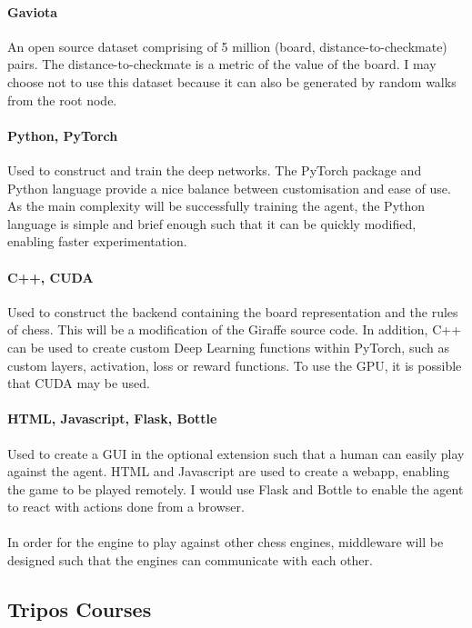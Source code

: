 \documentclass[a4paper]{article}
\begin{document}
\paragraph{Gaviota} An open source dataset comprising of 5 million (board, distance-to-checkmate) pairs. The distance-to-checkmate is a metric of the value of the board. I may choose not to use this dataset because it can also be generated by random walks from the root node. \cite{gaviota} \cite{giraffe}

\paragraph{Python, PyTorch} Used to construct and train the deep networks. The PyTorch package and Python language provide a nice balance between customisation and ease of use. As the main complexity will be successfully training the agent, the Python language is simple and brief enough such that it can be quickly modified, enabling faster experimentation.

\paragraph{C++, CUDA} Used to construct the backend containing the board representation and the rules of chess. This will be a modification of the Giraffe source code. In addition, C++ can be used to create custom Deep Learning functions within PyTorch, such as custom layers, activation, loss or reward functions. To use the GPU, it is possible that CUDA may be used.

\paragraph{HTML, Javascript, Flask, Bottle} Used to create a GUI in the optional extension such that a human can easily play against the agent. HTML and Javascript are used to create a webapp, enabling the game to be played remotely. I would use Flask and Bottle to enable the agent to react with actions done from a browser.

\paragraph{} In order for the engine to play against other chess engines, middleware will be designed such that the engines can communicate with each other.


\subsection*{Tripos Courses}
\end{document}
